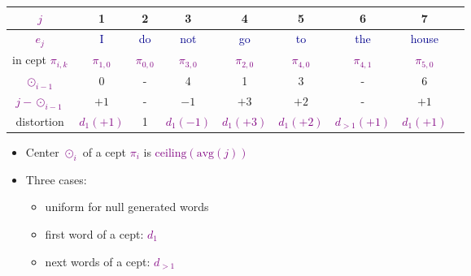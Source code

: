 \documentclass[landscape]{slides}
\newcommand{\example}[1]{\textcolor{darkblue}{\rm #1}}
\newcommand{\maths}[1]{\textcolor{purple}{#1}}
\begin{document}
\vspace{10mm}
\begin{tabular}{|c||c|c|c|c|c|c|c|c|} \hline
\maths{$j$} & 1 & 2 & 3 & 4 & 5 & 6 & 7 \\ \hline
\maths{$e_j$} & \example{I} & \example{do} & \example{not} & \example{go} & \example{to} & \example{the} & \example{house} \\\hline
in cept \maths{$\pi_{i,k}$} & \maths{$\pi_{1,0}$} & \maths{$\pi_{0,0}$} & \maths{$\pi_{3,0}$} & \maths{$\pi_{2,0}$} & \maths{$\pi_{4,0}$} & \maths{$\pi_{4,1}$} & \maths{$\pi_{5,0}$} \\ \hline
\maths{$\odot_{i-1}$}   & 0 & - & 4 & 1 & 3 & - & 6 \\ \hline
\maths{$j-\odot_{i-1}$} & $+1$ & - & $-1$ & $+3$ & $+2$ & - & $+1$ \\ \hline
distortion & \maths{$d_1(+1)$} & 1 & \maths{$d_1(-1)$} & \maths{$d_1(+3)$} & \maths{$d_1(+2)$} & \maths{$d_{>1}(+1)$} & \maths{$d_1(+1)$} \\ \hline 
\end{tabular}
\vspace{5mm}
\begin{itemize}
\item Center \maths{$\odot_i$} of a cept \maths{$\pi_i$} is \maths{$\text{ceiling}(\text{avg}(j))$}
\item Three cases:
\begin{itemize}
\item uniform for {\sc null} generated words
\item first word of a cept: \maths{$d_1$}
\item next words of a cept: \maths{$d_{>1}$}
\end{itemize}
\end{itemize}


\end{document}
